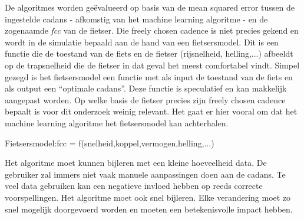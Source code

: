 \documentclass[12pt,a4paper,oneside]{book}
\newcommand\tab[1][1cm]{\hspace*{#1}}
\begin{document}
De algoritmes worden geëvalueerd op basis van de mean squared error tussen de ingestelde cadans - afkomstig van het machine learning algoritme - en de zogenaamde \textit{\gls{fcc}} van de fietser. Die freely chosen cadence is niet precies gekend en wordt in de simulatie bepaald aan de hand van een fietsersmodel. Dit is een functie die de toestand van de fiets en de fietser (rijsnelheid, helling,...) afbeeldt op de trapsnelheid die de fietser in dat geval het meest comfortabel vindt. Simpel gezegd is het fietsersmodel een functie met als input de toestand van de fiets en als output een “optimale cadans”. Deze functie is speculatief en kan makkelijk aangepast worden. Op welke basis de fietser precies zijn freely chosen cadence bepaalt is voor dit onderzoek weinig relevant. Het gaat er hier vooral om dat het machine learning algoritme het fietsersmodel kan achterhalen.
\\
\begin{center}
Fietsersmodel:\tab fcc = f(snelheid,koppel,vermogen,helling,...)
\end{center}
Het algoritme moet kunnen bijleren met een kleine hoeveelheid data. De gebruiker zal immers niet vaak manuele aanpassingen doen aan de cadans. Te veel data gebruiken kan een negatieve invloed hebben op reeds correcte voorspellingen. Het algoritme moet ook snel bijleren. Elke verandering moet zo snel mogelijk doorgevoerd worden en moeten een betekenisvolle impact hebben.
\end{document}
